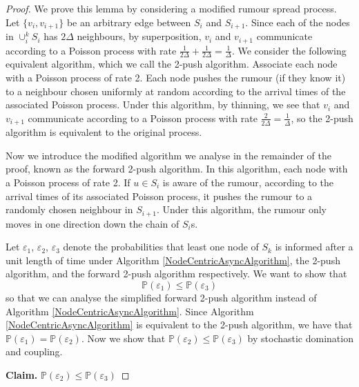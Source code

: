 \begin{proof}
	We prove this lemma by considering a modified rumour spread process.
	Let $\{v_i, v_{i+1}\}$ be an arbitrary edge between $S_i$ and $S_{i+1}$. Since each of the nodes in $\cup_i^k S_i$ has $2\Delta$ neighbours, by superposition, $v_i$ and $v_{i+1}$ communicate according to a Poisson process with rate $\frac{1}{2\Delta} + \frac{1}{2\Delta} = \frac{1}{\Delta}$. We consider the following equivalent algorithm, which we call the 2-push algorithm. Associate each node with a Poisson process of rate 2. Each node pushes the rumour (if they know it) to a neighbour chosen uniformly at random according to the arrival times of the associated Poisson process. Under this algorithm, by thinning, we see that $v_i$ and $v_{i+1}$ communicate according to a Poisson process with rate $\frac{2}{2\Delta} = \frac{1}{\Delta}$, so the 2-push algorithm is equivalent to the original process.

	Now we introduce the modified algorithm we analyse in the remainder of the proof, known as the forward 2-push algorithm. In this algorithm, each node with a Poisson process of rate 2. If $u \in S_i$ is aware of the rumour, according to the arrival times of its associated Poisson process, it pushes the rumour to a randomly chosen neighbour in $S_{i+1}$. Under this algorithm, the rumour only moves in one direction down the chain of $S_i$s.

	Let $\varepsilon_1$, $\varepsilon_2$, $\varepsilon_3$ denote the probabilities that least one node of $S_k$ is informed after a unit length of time under Algorithm \ref{NodeCentricAsyncAlgorithm}, the 2-push algorithm, and the forward 2-push algorithm respectively.
	We want to show that  
	$$
		\mathbb{P}(\varepsilon_1) \leq \mathbb{P}(\varepsilon_3)
	$$
	so that we can analyse the simplified forward 2-push algorithm instead of Algorithm \ref{NodeCentricAsyncAlgorithm}.
	Since Algorithm \ref{NodeCentricAsyncAlgorithm} is equivalent to the 2-push algorithm, we have that $
	\mathbb{P}(\varepsilon_1) = \mathbb{P}(\varepsilon_2)$. Now we show that $
	\mathbb{P}(\varepsilon_2) \leq \mathbb{P}(\varepsilon_3)$ by stochastic domination and coupling.

	\textbf{Claim. } $\mathbb{P}(\varepsilon_2) \leq \mathbb{P}(\varepsilon_3)$


\end{proof}
